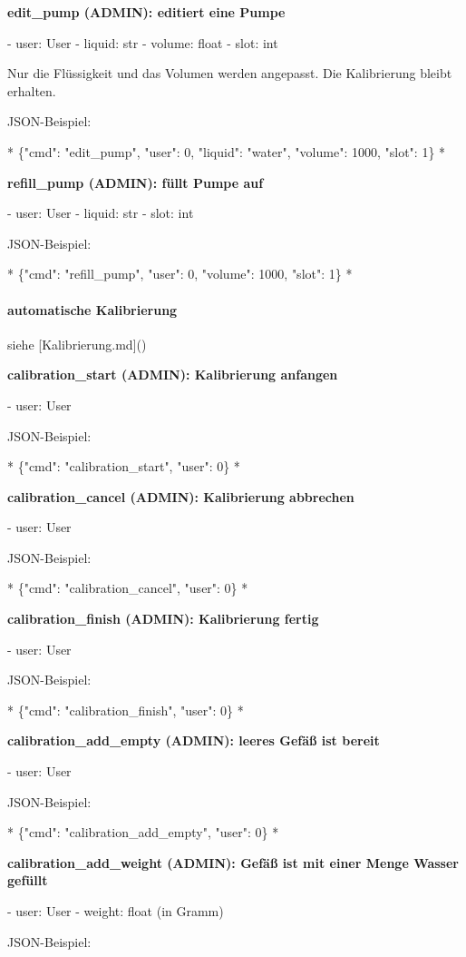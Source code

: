 \textbf{ edit\_pump (ADMIN): editiert eine Pumpe}

- user: User
- liquid: str
- volume: float
- slot: int

Nur die Flüssigkeit und das Volumen werden angepasst. Die Kalibrierung bleibt erhalten.

JSON-Beispiel:

*
\{"cmd": "edit\_pump", "user": 0, "liquid": "water", "volume": 1000, "slot": 1\}
*

\textbf{ refill\_pump (ADMIN): füllt Pumpe auf}

- user: User
- liquid: str
- slot: int

JSON-Beispiel:

*
\{"cmd": "refill\_pump", "user": 0, "volume": 1000, "slot": 1\}
*

\paragraph{ automatische Kalibrierung}

siehe [Kalibrierung.md]()

\textbf{ calibration\_start (ADMIN): Kalibrierung anfangen}

- user: User

JSON-Beispiel:

*
\{"cmd": "calibration\_start", "user": 0\}
*

\textbf{ calibration\_cancel (ADMIN): Kalibrierung abbrechen}

- user: User

JSON-Beispiel:

*
\{"cmd": "calibration\_cancel", "user": 0\}
*

\textbf{ calibration\_finish (ADMIN): Kalibrierung fertig}

- user: User

JSON-Beispiel:

*
\{"cmd": "calibration\_finish", "user": 0\}
*

\textbf{ calibration\_add\_empty (ADMIN): leeres Gefäß ist bereit}

- user: User

JSON-Beispiel:

*
\{"cmd": "calibration\_add\_empty", "user": 0\}
*

\textbf{ calibration\_add\_weight (ADMIN): Gefäß ist mit einer Menge Wasser gefüllt}

- user: User
- weight: float (in Gramm)

JSON-Beispiel:

